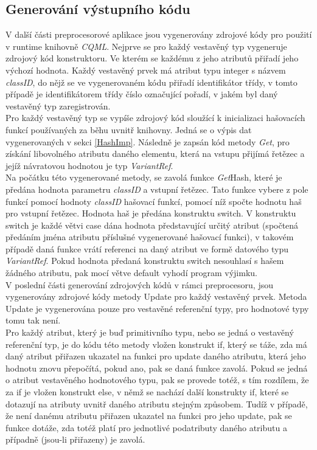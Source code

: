 \documentclass[11pt,twoside,a4paper]{book}
\begin{document}
{{\begin{ttemize}
{{\begin{lastlisting}[frame=single,caption=Řešení v pseudokódu problematického použití operátoru "." v přiřazovacím výroku,label=lst:var0N]
\subsection{Generování výstupního kódu}
V další části preprocesorové aplikace jsou vygenerovány zdrojové kódy pro použití v runtime knihovně \textit{CQML}.
Nejprve se pro každý vestavěný typ vygeneruje zdrojový kód konstruktoru. Ve kterém se každému z jeho atributů přiřadí jeho výchozí hodnota. Každý vestavěný prvek má atribut typu integer s názvem \textit{classID}, do nějž se ve vygenerovaném kódu přiřadí identifikátor třídy, v tomto případě je identifikátorem třídy číslo označující pořadí, v jakém byl daný vestavěný typ zaregistrován.\\
Pro každý vestavěný typ se vypíše zdrojový kód sloužící k inicializaci hašovacích funkcí používaných za běhu uvnitř knihovny. Jedná se o výpis dat vygenerovaných v sekci \ref{HashImp}.
Následně je zapsán kód metody \textit{Get}, pro získání libovolného atributu daného elementu, která na vstupu přijímá řetězec a jejíž návratovou hodnotou je typ \textit{VariantRef}.\\
Na počátku této vygenerované metody, se zavolá funkce \textit{Get}Hash, které je předána hodnota parametru \textit{classID} a vstupní řetězec. Tato funkce vybere z pole funkcí pomocí hodnoty \textit{classID} hašovací funkcí, pomocí níž spočte hodnotu haš pro vstupní řetězec. Hodnota haš je předána konstruktu switch. V konstruktu switch je každé větvi case dána hodnota představující určitý atribut (spočtená předáním jména atributu příslušné vygenerované hašovací funkci), v takovém případě daná funkce vrátí referenci na daný atribut ve formě datového typu \textit{VariantRef}. Pokud hodnota předaná konstruktu switch nesouhlasí s hašem žádného atributu, pak mocí větve default vyhodí program výjimku.\\


V poslední části generování zdrojových kódů v rámci preprocesoru, jsou vygenerovány zdrojové kódy metody Update pro každý vestavěný prvek. Metoda Update je vygenerována pouze pro vestavěné referenční typy, pro hodnotové typy tomu tak není. \\
Pro každý atribut, který je buď primitivního typu, nebo se jedná o vestavěný referenční typ, je do kódu této metody vložen konstrukt if, který se táže, zda má daný atribut přiřazen ukazatel na funkci pro update daného atributu, která jeho hodnotu znovu přepočítá, pokud ano, pak se daná funkce zavolá.
Pokud se jedná o atribut vestavěného hodnotového typu, pak se provede totéž, s tím rozdílem, že za if je vložen konstrukt else, v němž se nachází další konstrukty if, které se dotazují na atributy uvnitř daného atributu stejným způsobem. Tudíž v případě, že není danému atributu přiřazen ukazatel na funkci pro jeho update, pak se funkce dotáže, zda totéž platí pro jednotlivé podatributy daného atributu a případně (jsou-li přiřazeny) je zavolá.\\



\end{lastlisting}}}
\end{ttemize}}}
\end{document}
